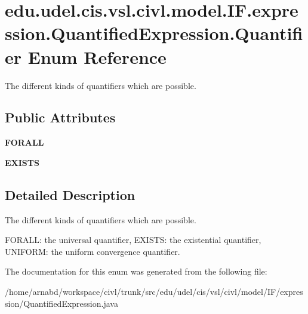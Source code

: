 \hypertarget{enumedu_1_1udel_1_1cis_1_1vsl_1_1civl_1_1model_1_1IF_1_1expression_1_1QuantifiedExpression_1_1Quantifier}{}\section{edu.\+udel.\+cis.\+vsl.\+civl.\+model.\+I\+F.\+expression.\+Quantified\+Expression.\+Quantifier Enum Reference}
\label{enumedu_1_1udel_1_1cis_1_1vsl_1_1civl_1_1model_1_1IF_1_1expression_1_1QuantifiedExpression_1_1Quantifier}


The different kinds of quantifiers which are possible.  


\subsection*{Public Attributes}
\begin{DoxyCompactItemize}
\item 
\hypertarget{enumedu_1_1udel_1_1cis_1_1vsl_1_1civl_1_1model_1_1IF_1_1expression_1_1QuantifiedExpression_1_1Quantifier_ab8aee3f5868b0f7c848cce3741fb2e01}{}{\bfseries F\+O\+R\+A\+L\+L}\label{enumedu_1_1udel_1_1cis_1_1vsl_1_1civl_1_1model_1_1IF_1_1expression_1_1QuantifiedExpression_1_1Quantifier_ab8aee3f5868b0f7c848cce3741fb2e01}

\item 
\hypertarget{enumedu_1_1udel_1_1cis_1_1vsl_1_1civl_1_1model_1_1IF_1_1expression_1_1QuantifiedExpression_1_1Quantifier_a5fb7febdacf7985af10366f72810928e}{}{\bfseries E\+X\+I\+S\+T\+S}\label{enumedu_1_1udel_1_1cis_1_1vsl_1_1civl_1_1model_1_1IF_1_1expression_1_1QuantifiedExpression_1_1Quantifier_a5fb7febdacf7985af10366f72810928e}

\end{DoxyCompactItemize}


\subsection{Detailed Description}
The different kinds of quantifiers which are possible. 

F\+O\+R\+A\+L\+L\+: the universal quantifier, E\+X\+I\+S\+T\+S\+: the existential quantifier, U\+N\+I\+F\+O\+R\+M\+: the uniform convergence quantifier. 

The documentation for this enum was generated from the following file\+:\begin{DoxyCompactItemize}
\item 
/home/arnabd/workspace/civl/trunk/src/edu/udel/cis/vsl/civl/model/\+I\+F/expression/Quantified\+Expression.\+java\end{DoxyCompactItemize}

